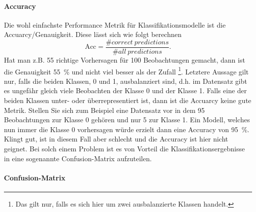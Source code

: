 \documentclass[twoside=true, openright, pdftex, bibliography=totoc, chapterprefix=true, appendixprefix=true, numbers=noenddot, parskip=half, titlepage, index=totoc, headlines=3, footlines=2, headings=normal, language=german]{scrartcl}
\begin{document}
\paragraph{Accuracy}
Die wohl einfachste Performance Metrik für Klassifikationsmodelle ist die Accuarcy/Genauigkeit. Diese lässt sich wie folgt berechnen
\begin{equation}
\mathrm{Acc} = \frac{\# correct\ predictions }{\# all\ predictions}.
\end{equation}
Hat man z.B. 55 richtige Vorhersagen für 100 Beobachtungen gemacht, dann ist die Genauigkeit 55~\% und nicht viel besser als der Zufall \footnote{Das gilt nur, falls es sich hier um zwei ausbalanzierte Klassen handelt.}. Letztere Aussage gilt nur, falls die beiden Klassen, 0 und 1, ausbalanziert sind, d.h. im Datensatz gibt es ungefähr gleich viele Beobachten der Klasse 0 und der Klasse 1. Falls eine der beiden Klassen unter- oder überrepresentiert ist, dann ist die Accuarcy keine gute Metrik. Stellen Sie sich zum Beispiel eine Datensatz vor in dem 95 Beobachtungen zur Klasse 0 gehören und nur 5 zur Klasse 1. Ein Modell, welches nun immer die Klasse 0 vorhersagen würde erzielt dann eine Accuracy von 95~\%. Klingt gut, ist in diesem Fall aber schlecht und die Accuracy ist hier nicht geignet. Bei solch einem Problem ist es von Vorteil die Klassifikationsergebnisse in eine sogenannte Confusion-Matrix aufzuteilen.

\paragraph{Confusion-Matrix}
\end{document}
